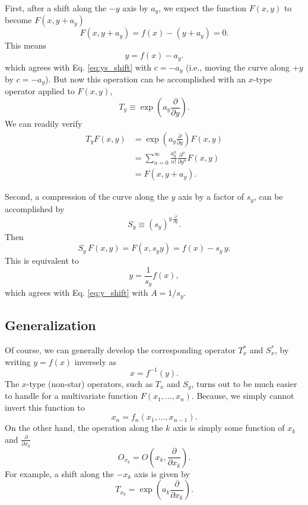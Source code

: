 \documentclass{article}
\begin{document}
First, after a shift along the $-y$ axis by $a_y$, we expect
the function $F(x, y)$ to become $F(x, y + a_y)$
$$
F(x, y + a_y) = f(x) - (y + a_y) = 0.
$$
This means
$$
  y = f(x) - a_y.
$$
which agrees with Eq. \eqref{eq:ys_shift} with $c = - a_y$
(i.e., moving the curve along $+y$ by $c = -a_y$).
But now this operation can be accomplished with an $x$-type
operator applied to $F(x, y)$,
\begin{equation}
  T_y \equiv
  \exp\left(a_y \frac{ \partial } { \partial y } \right).
  \label{eq:y_shift}
\end{equation}
We can readily verify
$$
\begin{aligned}
T_y F(x, y)
&= \exp\left(a_y \frac{ \partial } { \partial y } \right) F(x, y) \\
&= \sum_{n = 0}^\infty \frac{ a_y^n }{n!}
\frac{ \partial^n } {\partial y^n} F(x, y) \\
&= F(x, y + a_y).
\end{aligned}
$$


Second,
a compression of the curve
along the $y$ axis by a factor of $s_y$,
can be accomplished by
\begin{equation}
  S_y \equiv
  (s_y)^{ y \, \frac{ \partial } { \partial y } }.
  \label{eq:y_scale}
\end{equation}
Then
$$
S_y \, F(x, y)
=
F(x, s_y y)
= f(x) - s_y \, y.
$$
This is equivalent to
$$
y = \frac{1}{s_y} f(x),
$$
which agrees with Eq. \eqref{eq:y_shift} with $A = 1/s_y$.


\subsection{Generalization}

Of course, we can generally develop the corresponding
operator $T_x^*$ and $S_x^*$, by writing $y = f(x)$ inversely as
$$
x = f^{-1}(y).
$$
The $x$-type (non-star) operators, such as $T_x$ and $S_y$, turns
out to be much easier to handle for a multivariate
function $F(x_1, \dots, x_n)$.  Because, we simply cannot invert
this function to
$$
x_n = f_n(x_1, \dots, x_{n-1}).
$$
On the other hand, the operation along the $k$ axis is
simply some function of $x_k$ and $\frac{ \partial }{ \partial x_k}$
$$
O_{x_k} = O\left(x_k,  \frac{ \partial } { \partial x_k }\right).
$$
For example, a shift along the $-x_k$ axis is given by
$$
T_{x_k} = \exp\left( a_k \frac{ \partial } { \partial x_k } \right).
$$
\end{document}
